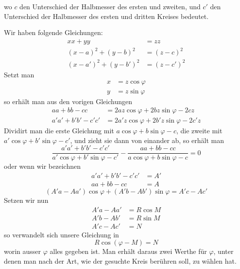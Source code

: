 %
wo \(c\) den Unterschied der Halbmesser des ersten und zweiten, und \(c'\) den Unterschied der Halbmesser des ersten und dritten Kreises bedeutet.

Wir haben folgende Gleichungen:
\[
\begin{aligned}
xx+yy&=zz\\
(x-a)^2+(y-b)^2&=(z-c)^2\\
(x-a')^2+(y-b')^2&=(z-c')^2
\end{aligned}
\]
Setzt man
\[
\begin{aligned}x&=z\cos\varphi\\y&=z\sin\varphi\end{aligned}
\]
so erhält man aus den vorigen Gleichungen
\[
\begin{aligned}
aa+bb-cc&=2az\cos\varphi+2bz\sin\varphi-2cz\\
a'a'+b'b'-c'c'&=2a'z\cos\varphi+2b'z\sin\varphi-2c'z
\end{aligned}
\]
Dividirt man die erste Gleichung mit \(a\cos\varphi+b\sin\varphi-c\), die zweite mit \(a'\cos\varphi+b'\sin\varphi-c'\), und zieht sie dann von einander ab, so erhält man
\[
\frac{a'a'+b'b'-c'c'}{a'\cos\varphi+b'\sin\varphi-c'}-\frac{aa+bb-cc}{a\cos\varphi+b\sin\varphi-c}=0
\]
oder wenn wir bezeichnen
\[
\begin{aligned}a'a'+b'b'-c'c'&=A'\\aa+bb-cc&=A\end{aligned}
\]
\[
(A'a-Aa')\cos\varphi+(A'b-Ab')\sin\varphi=A'c-Ac'
\]
Setzen wir nun
\[
\begin{aligned}A'a-Aa'&=R\cos M\\A'b-Ab'&=R\sin M\\A'c-Ac'&=N\end{aligned}
\]
so verwandelt sich unsere Gleichung in
\[
R\cos(\varphi-M)=N
\]
worin ausser \(\varphi\) alles gegeben ist. Man erhält daraus zwei Werthe für \(\varphi\), unter denen man nach der Art, wie der gesuchte Kreis berühren soll, zu wählen hat.
